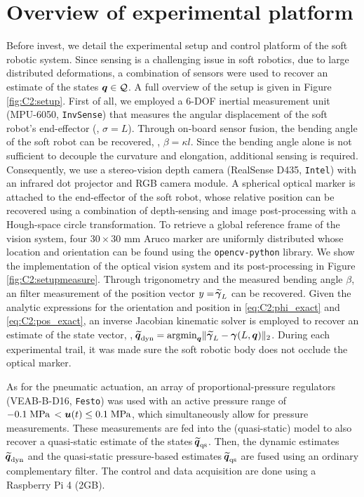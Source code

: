\section{Overview of experimental platform}
\noindent Before invest, we detail the experimental setup and control platform of the soft robotic system. Since sensing is a challenging issue in soft robotics, due to large distributed deformations, a combination of sensors were used to recover an estimate of the states ${\boldsymbol{q}} \in \mathcal{Q}$. A full overview of the setup is given in Figure \ref{fig:C2:setup}. First of all, we employed a 6-DOF inertial measurement unit (MPU-6050, \texttt{InvSense}) that measures the angular displacement of the soft robot's end-effector (\ie, $\sigma = L$). Through on-board sensor fusion, the bending angle of the soft robot can be recovered, \ie, $\beta = \kappa l$. Since the bending angle alone is not sufficient to decouple the curvature and elongation, additional sensing is required. Consequently, we use a stereo-vision depth camera (RealSense D435, \texttt{Intel}) with an infrared dot projector and RGB camera module. A spherical optical marker is attached to the end-effector of the soft robot, whose relative position can be recovered using a combination of depth-sensing and image post-processing with a Hough-space circle transformation. To retrieve a global reference frame of the vision system, four $30\!\times \!30$ \si{\milli \metre} Aruco marker are uniformly distributed whose location and orientation can be found using the \texttt{opencv-python} library. We show the implementation of the optical vision system and its post-processing in Figure \ref{fig:C2:setupmeasure}. Through trigonometry and the measured bending angle $\beta$, an filter measurement of the position vector $y = \widetilde{\!\boldsymbol{\gamma}}_L$ can be recovered. Given the analytic expressions for the orientation and position in \eqref{eq:C2:phi_exact} and \eqref{eq:C2:pos_exact}, an inverse Jacobian kinematic solver is employed to recover an estimate of the state vector, \ie, $\widetilde{\!\boldsymbol{q}}_{\textrm{dyn}} = \textrm{argmin}_{{\boldsymbol{q}}} \lVert \, \widetilde{\!\boldsymbol{\gamma}}_L - {\boldsymbol{\gamma}}(L,{\boldsymbol{q}}) \rVert_2$. During each experimental trail, it was made sure the soft robotic body does not occlude the optical marker.

As for the pneumatic actuation, an array of proportional-pressure regulators (VEAB-B-D16, \texttt{Festo}) was used with an active pressure range of $-0.1 \;\text{MPa}\, < {\boldsymbol{u}}(t) \le 0.1 \; \textrm{MPa}$, which simultaneously allow for pressure measurements. These measurements are fed into the (quasi-static) model to also recover a quasi-static estimate of the states $\widetilde{\!\boldsymbol{q}}_{\textrm{qs}}$. Then, the dynamic estimates $\widetilde{\!\boldsymbol{q}}_{\textrm{dyn}}$ and the quasi-static pressure-based estimates $\widetilde{\!\boldsymbol{q}}_{\textrm{qs}}$ are fused using an ordinary complementary filter. The control and data acquisition are done using a {Raspberry Pi 4} (2GB). 

